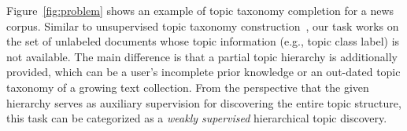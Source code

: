 Figure~\ref{fig:problem} shows an example of topic taxonomy completion for a news corpus.
Similar to unsupervised topic taxonomy construction~\cite{zhang2018taxogen, shang2020nettaxo}, our task works on the set of unlabeled documents whose topic information (e.g., topic class label) is not available.
The main difference is that a partial topic hierarchy is additionally provided, which can be a user's incomplete prior knowledge or an out-dated topic taxonomy of a growing text collection.
From the perspective that the given hierarchy serves as auxiliary supervision for discovering the entire topic structure, this task can be categorized as a \textit{weakly supervised} hierarchical topic discovery.